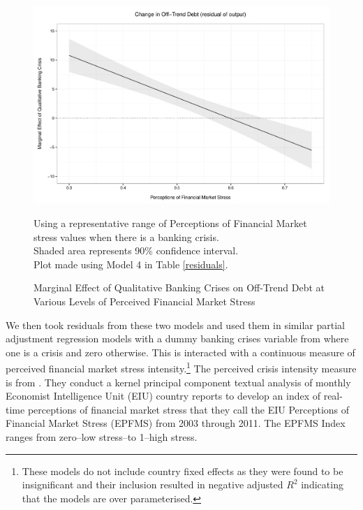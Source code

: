 \documentclass[]{article}
\begin{document}
\begin{figure}
    \caption{Marginal Effect of Qualitative Banking Crises on Off-Trend Debt at Various Levels of Perceived Financial Market Stress}
    \label{me_stress_crisis}

    \begin{center}
        \includegraphics[scale=0.45]{analysis/figures/lv_epfms.pdf}
    \end{center}

    {\scriptsize{Using a representative range of Perceptions of Financial Market stress values when there is a \cite{laeven2013} banking crisis. \\
    Shaded area represents 90\% confidence interval. \\
    Plot made using Model 4 in Table \ref{residuals}.}}

\end{figure}

We then took residuals from these two models and used them in similar partial adjustment regression models with a dummy banking crises variable from \cite{laeven2013} where one is a crisis and zero otherwise. This is interacted with a continuous measure of perceived financial market stress intensity.\footnote{These models do not include country fixed effects as they were found to be insignificant and their inclusion resulted in negative adjusted $R^{2}$ indicating that the models are over parameterised.} The perceived crisis intensity measure is from \cite{gandrudHallEPFMS}. They conduct a kernel principal component textual analysis \citep{Spirling2012} of monthly Economist Intelligence Unit (EIU) country reports to develop an index of real-time perceptions of financial market stress that they call the EIU Perceptions of Financial Market Stress (EPFMS) from 2003 through 2011. The EPFMS Index ranges from zero--low stress--to 1--high stress.
\end{document}
